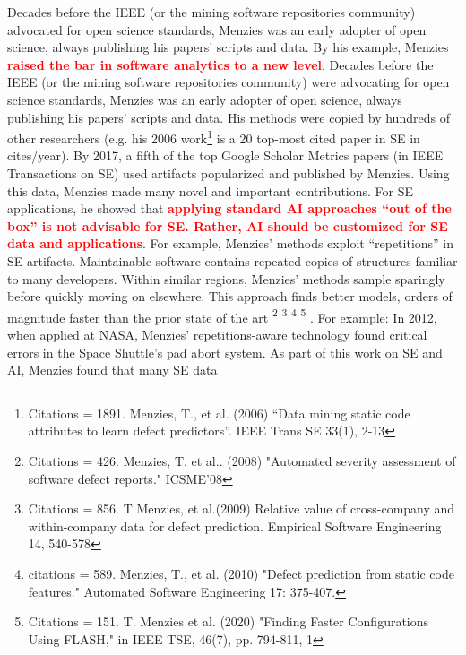 \documentclass[10pt]{article}
\begin{document}
Decades before the IEEE (or the mining software repositories
community) advocated for open science standards, Menzies was an
early adopter of open science, always publishing his papers’ scripts
and data.
By his example, Menzies 
\textcolor{red}{{\bf raised the bar in software analytics to a new level}}. 
Decades before the IEEE (or the mining software repositories community) were advocating for open science standards, 
Menzies was an early adopter of open science, always publishing his papers’ scripts and data. 
His methods were copied by hundreds of other researchers (e.g. his 2006 work\footnote{
Citations = 1891. 	
Menzies, T., et al. (2006) “Data mining static code attributes to learn defect predictors”. IEEE Trans SE 33(1), 2-13 } is a 20 top-most cited paper in SE in cites/year). 
By 2017, a fifth of the top Google Scholar Metrics papers (in IEEE Transactions on SE) used artifacts popularized and published by Menzies.
Using this data, Menzies made many novel and important contributions.
For SE applications, he showed that
\textcolor{red}{{\bf applying standard AI approaches “out of the box” is not advisable for SE. Rather, AI should be customized for SE data and 
applications}}. For example, 
Menzies’ methods exploit “repetitions” in SE artifacts. 
Maintainable software contains repeated copies of structures familiar to many developers. 
Within similar regions, Menzies’ methods sample sparingly before quickly moving on elsewhere. This approach finds better models, orders of 
magnitude faster than the prior state of the art \footnote{
Citations = 426. 	Menzies, T. et al.. (2008) "Automated severity assessment of software defect reports." ICSME’08 } \footnote{
Citations = 856.
T Menzies, et al.(2009)  Relative value of cross-company and within-company data for defect prediction.    Empirical Software Engineering 14, 540-578
} \footnote{
citations = 589. 	  Menzies, T., et al. (2010)  "Defect prediction from static code features." Automated Software Engineering 17: 375-407. 
} \footnote{
Citations = 151.  T. Menzies   et al. (2020) "Finding Faster Configurations Using FLASH," in IEEE TSE, 46(7), pp. 794-811, 1  }
. For example:
In 2012, when applied at NASA, Menzies’ repetitions-aware technology found critical errors in the Space Shuttle’s pad abort system.
As part of this work on SE and AI, Menzies found that many SE data
\end{document}
